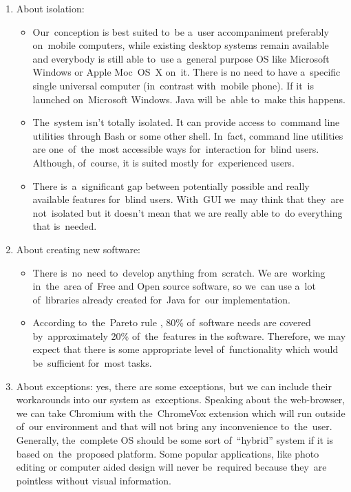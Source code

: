 \documentclass{acm_proc_article-sp}
\begin{document}
\begin{enumerate}

\item {About isolation:}
\begin{itemize}
\item {
Our~conception is best suited to~be a~user accompaniment preferably on~mobile computers,
while existing desktop systems remain available 
and everybody is still able to~use a~general purpose OS like Microsoft Windows or Apple Moc~OS~X on~it.
There is no need to have a~specific single universal computer (in~contrast with~mobile phone).
If it~is launched on~Microsoft Windows. Java will be~able to~make this happens.
}
\item {
The~system isn't totally isolated.
It can provide access to~command line utilities 
through Bash or some other shell.
In~fact, command line utilities are one~of~the~most accessible ways for~interaction for~blind users.
Although, of~course, it is suited mostly for~experienced users. 
}
\item {
There is~a~significant gap between potentially possible and really available features for~blind users.
With~GUI we~may think that they~are not~isolated but it doesn't mean that 
we are really able to~do everything that is~needed.
}
\end{itemize}

\item {About creating new software:}
\begin{itemize}
\item {
There is~no~need to~develop anything from~scratch.
We are~working in~the~area of~Free and Open source software,
so we~can use a~lot of~libraries already created for~Java for~our implementation.
}
\item {
According to~the~Pareto rule \cite{pareto},
80\% of~software needs are covered by~approximately 20\% of~the~features in the software.
Therefore, we may expect that there is some appropriate level of~functionality which would be~sufficient for~most tasks.
}
\end{itemize}

\item {About exceptions:
yes, there are some exceptions, but we can include their workarounds into our system as~exceptions.
Speaking about the web-browser, we can take Chromium \cite{chromium} with the~ChromeVox extension \cite{chromevox}
which will run outside of~our environment and that will not bring any inconvenience to~the~user.
Generally, the~complete OS should be some sort of~``hybrid'' system 
if it is based on~the~proposed platform. 
Some popular applications, like photo editing or computer aided design will never be~required 
because they~are pointless without visual information.
}
\end{enumerate}
\end{document}
